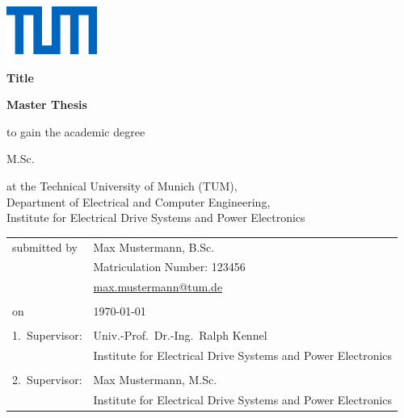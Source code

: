 \documentclass[journal]{IEEEtran}
\begin{document}
{	%
	\begin{titlepage}
		\hfill\includegraphics{Images/TUM.pdf}\par%
		\vspace{3cm}%
		{\noindent\Huge\bfseries\sffamily Title\par}
		\vspace{0.5cm}%
		{\noindent\LARGE\bfseries\sffamily Master Thesis\par}
		\vfill%
		{\noindent\large to gain the academic degree\par
		\vspace{1em}
		\noindent M.Sc.\par
		\vspace{1em}
		\noindent at the Technical University of Munich (TUM),\\ Department of Electrical and Computer Engineering,\\ Institute for Electrical Drive Systems and Power Electronics\par
		\vspace{3cm}%
		\noindent%
		\begin{tabular}{@{}ll@{}}
					submitted by
				&
					Max Mustermann, B.Sc.
					\\&
					Matriculation Number: 123456
					\\&
					\url{max.mustermann@tum.de}
					
			\\
				\hfill
			\\
					on
				&
					\today	
			\\
				\hfill
			\\
					1.\ Supervisor:
				&
					Univ.-Prof.\ Dr.-Ing.\ Ralph Kennel
					\\&
					Institute for Electrical Drive Systems and Power Electronics
					
			\\
				\hfill
			\\
					2.\ Supervisor:
				&
					Max Mustermann, M.Sc.
					\\&
					Institute for Electrical Drive Systems and Power Electronics
		\end{tabular}%
		}%
	\end{titlepage}
}{}
\end{document}
